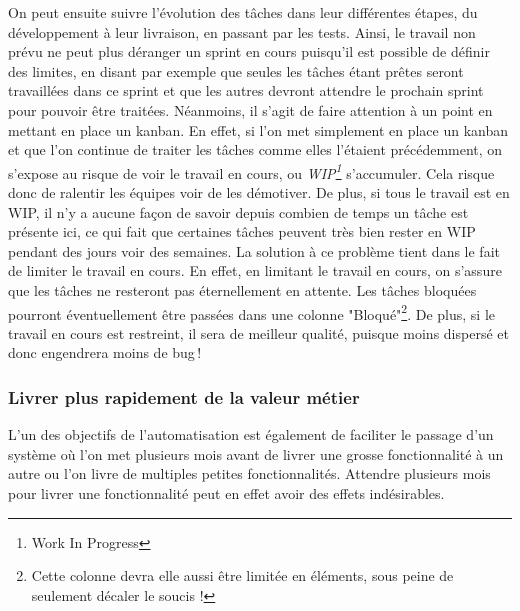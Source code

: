 On peut ensuite suivre l'évolution des tâches dans leur différentes étapes, du développement à leur livraison, en passant par les tests. Ainsi, le travail non prévu ne peut plus déranger un sprint en cours puisqu'il est possible de définir des limites, en disant par exemple que seules les tâches étant prêtes seront travaillées dans ce sprint et que les autres devront attendre le prochain sprint pour pouvoir être traitées. Néanmoins, il s'agit de faire attention à un point en mettant en place un kanban. En effet, si l'on met simplement en place un kanban et que l'on continue de traiter les tâches comme elles l'étaient précédemment, on s'expose au risque de voir le travail en cours, ou \emph{WIP\footnote{Work In Progress}} s'accumuler. Cela risque donc de ralentir les équipes voir de les démotiver. De plus, si tous le travail est en WIP, il n'y a aucune façon de savoir depuis combien de temps un tâche est présente ici, ce qui fait que certaines tâches peuvent très bien rester en WIP pendant des jours voir des semaines. La solution à ce problème tient dans le fait de limiter le travail en cours. En effet, en limitant le travail en cours, on s'assure que les tâches ne resteront pas éternellement en attente. Les tâches bloquées pourront éventuellement être passées dans une colonne "Bloqué"\footnote{Cette colonne devra elle aussi être limitée en éléments, sous peine de seulement décaler le soucis !}. De plus, si le travail en cours est restreint, il sera de meilleur qualité, puisque moins dispersé et donc engendrera moins de bug !

\subsubsection{Livrer plus rapidement de la valeur métier}
L'un des objectifs de l'automatisation est également de faciliter le passage d'un système où l'on met plusieurs mois avant de livrer une grosse fonctionnalité à un autre ou l'on livre de multiples petites fonctionnalités. Attendre plusieurs mois pour livrer une fonctionnalité peut en effet avoir des effets indésirables.


